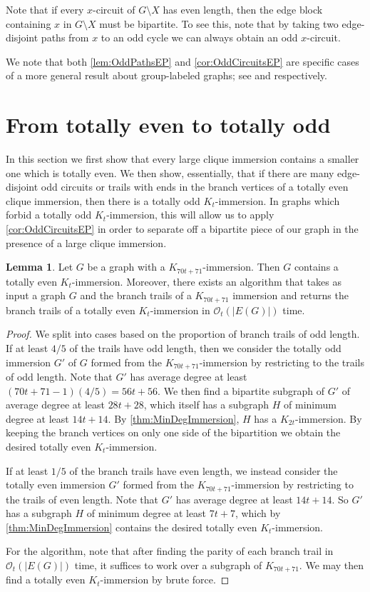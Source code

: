 \documentclass{article}
\theoremstyle{definition}
\newtheorem{lemma}[environment]{Lemma}
\begin{document}
Note that if every $x$-circuit of $G \setminus X$ has even length, then the edge block containing $x$ in $G \setminus X$ must be bipartite. To see this, note that by taking two edge-disjoint paths from $x$ to an odd cycle we can always obtain an odd $x$-circuit.

We note that both \cref{lem:OddPathsEP} and \cref{cor:OddCircuitsEP} are specific cases of a more general result about group-labeled graphs; see \cite{chudnovsky2006packing} and \cite{McCartyMW2026Structure} respectively.

\section{From totally even to totally odd}
In this section we first show that every large clique immersion contains a smaller one which is totally even. We then show, essentially, that if there are many edge-disjoint odd circuits or trails with ends in the branch vertices of a totally even clique immersion, then there is a totally odd $K_t$-immersion. In graphs which forbid a totally odd $K_t$-immersion, this will allow us to apply \cref{cor:OddCircuitsEP} in order to separate off a bipartite piece of our graph in the presence of a large clique immersion.

\begin{lemma}\label{lem:MakingTotallyEven}
    Let $G$ be a graph with a $K_{70t + 71}$-immersion. Then $G$ contains a totally even $K_t$-immersion. Moreover, there exists an algorithm that takes as input a graph $G$ and the branch trails of a $K_{70t + 71}$ immersion and returns the branch trails of a totally even $K_t$-immersion in $\mathcal{O}_t(|E(G)|)$ time.
\end{lemma}
\begin{proof}
    We split into cases based on the proportion of branch trails of odd length. If at least $4/5$ of the trails have odd length, then we consider the totally odd immersion $G'$ of $G$ formed from the $K_{70t + 71}$-immersion by restricting to the trails of odd length. Note that $G'$ has average degree at least $(70t + 71-1)(4/5) =56t + 56$. We then find a bipartite subgraph of $G'$ of average degree at least $28t + 28$, which itself has a subgraph $H$ of minimum degree at least $14t + 14$. By \cref{thm:MinDegImmersion}, $H$ has a $K_{2t}$-immersion. By keeping the branch vertices on only one side of the bipartition we obtain the desired totally even $K_t$-immersion.

    If at least $1/5$ of the branch trails have even length, we instead consider the totally even immersion $G'$ formed from the $K_{70t + 71}$-immersion by restricting to the trails of even length. Note that $G'$ has average degree at least $14t + 14$. So $G'$ has a subgraph $H$ of minimum degree at least $7t + 7$, which by \cref{thm:MinDegImmersion} contains the desired totally even $K_t$-immersion.

    For the algorithm, note that after finding the parity of each branch trail in $\mathcal{O}_t(|E(G)|)$ time, it suffices to work over a subgraph of $K_{70t + 71}$. We may then find a totally even $K_t$-immersion by brute force.
\end{proof}
\end{document}
